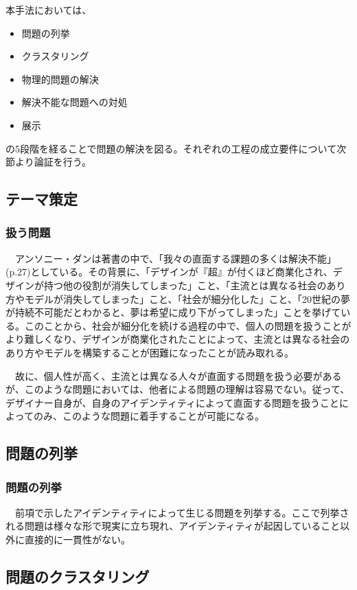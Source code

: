 \documentclass{jsarticle}
\begin{document}
本手法においては、
\begin{itemize}
  \item{問題の列挙}
  \item{クラスタリング}
  \item{物理的問題の解決}
  \item{解決不能な問題への対処}
  \item{展示}
\end{itemize}
の5段階を経ることで問題の解決を図る。それぞれの工程の成立要件について次節より論証を行う。

\subsection{テーマ策定}


\subsubsection{扱う問題}
　アンソニー・ダンは著書の中で、「我々の直面する課題の多くは解決不能」(p.27)としている。その背景に、「デザインが『超』が付くほど商業化され、デザインが持つ他の役割が消失してしまった」こと、「主流とは異なる社会のあり方やモデルが消失してしまった」こと、「社会が細分化した」こと、「20世紀の夢が持続不可能だとわかると、夢は希望に成り下がってしまった」ことを挙げている。このことから、社会が細分化を続ける過程の中で、個人の問題を扱うことがより難しくなり、デザインが商業化されたことによって、主流とは異なる社会のあり方やモデルを構築することが困難になったことが読み取れる。

　故に、個人性が高く、主流とは異なる人々が直面する問題を扱う必要があるが、このような問題においては、他者による問題の理解は容易でない。従って、デザイナー自身が、自身のアイデンティティによって直面する問題を扱うことによってのみ、このような問題に着手することが可能になる。

\newpage
\subsection{問題の列挙}

\subsubsection{問題の列挙}
　前項で示したアイデンティティによって生じる問題を列挙する。ここで列挙される問題は様々な形で現実に立ち現れ、アイデンティティが起因していること以外に直接的に一貫性がない。

\newpage
\subsection{問題のクラスタリング}
\end{document}
